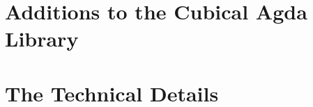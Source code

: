 \documentclass[twoside,11pt,openright]{report}
\theoremstyle{plain} %
\theoremstyle{definition}
\theoremstyle{remark}
\begin{document}

\cleardoublepage
{}
 



\cleardoublepage
\appendix

\chapter{Additions to the Cubical Agda Library}


\chapter{The Technical Details}

\todo[inline]{\dots}
\end{document}
